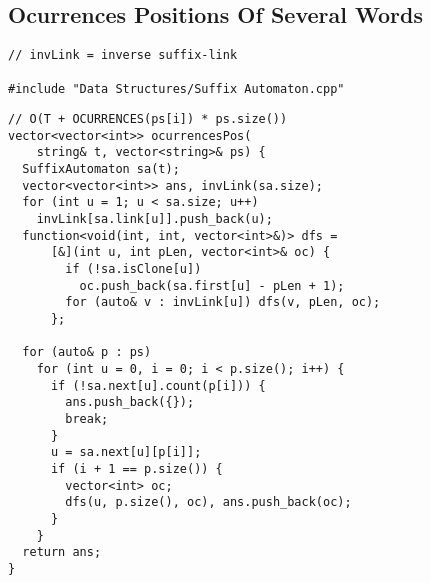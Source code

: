 \documentclass[twoside]{article}
\newcommand{\fileTitleStyle}{\large\underline}
\begin{document}
\begin{multicols*}{2}
\subsectionfont{\centering\bfseries\LARGE}
\subsectionfont{\fileTitleStyle}
\subsection*{Ocurrences Positions Of Several Words}
\begin{verbatim}
// invLink = inverse suffix-link

#include "Data Structures/Suffix Automaton.cpp"
\end{verbatim}
\vspace{-12pt}
\begin{verbatim}
// O(T + OCURRENCES(ps[i]) * ps.size())
vector<vector<int>> ocurrencesPos(
    string& t, vector<string>& ps) {
  SuffixAutomaton sa(t);
  vector<vector<int>> ans, invLink(sa.size);
  for (int u = 1; u < sa.size; u++)
    invLink[sa.link[u]].push_back(u);
  function<void(int, int, vector<int>&)> dfs =
      [&](int u, int pLen, vector<int>& oc) {
        if (!sa.isClone[u])
          oc.push_back(sa.first[u] - pLen + 1);
        for (auto& v : invLink[u]) dfs(v, pLen, oc);
      };

  for (auto& p : ps)
    for (int u = 0, i = 0; i < p.size(); i++) {
      if (!sa.next[u].count(p[i])) {
        ans.push_back({});
        break;
      }
      u = sa.next[u][p[i]];
      if (i + 1 == p.size()) {
        vector<int> oc;
        dfs(u, p.size(), oc), ans.push_back(oc);
      }
    }
  return ans;
}
\end{verbatim}

\subsectionfont{\centering\bfseries\LARGE}
\subsectionfont{\fileTitleStyle}

\end{multicols*}
\end{document}
